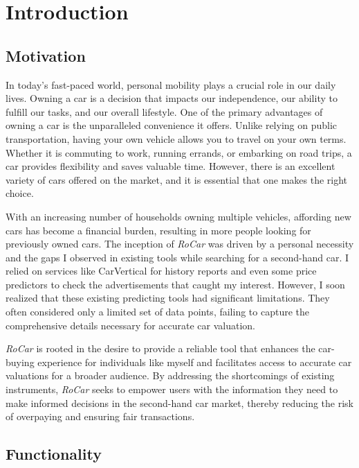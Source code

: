 \chapter{Introduction}

\section{Motivation}

In today's fast-paced world, personal mobility plays a crucial role in our daily lives. Owning a car is a decision that impacts our independence, our ability to fulfill our tasks, and our overall lifestyle. One of the primary advantages of owning a car is the unparalleled convenience it offers. Unlike relying on public transportation, having your own vehicle allows you to travel on your own terms. Whether it is commuting to work, running errands, or embarking on road trips, a car provides flexibility and saves valuable time. However, there is an excellent variety of cars offered on the market, and it is essential that one makes the right choice.

With an increasing number of households owning multiple vehicles, affording new cars has become a financial burden, resulting in more people looking for previously owned cars. The inception of \textit{RoCar} was driven by a personal necessity and the gaps I observed in existing tools while searching for a second-hand car. I relied on services like CarVertical \cite{carVertical} for history reports and even some price predictors to check the advertisements that caught my interest. However, I soon realized that these existing predicting tools had significant limitations. They often considered only a limited set of data points, failing to capture the comprehensive details necessary for accurate car valuation.

\textit{RoCar} is rooted in the desire to provide a reliable tool that enhances the car-buying experience for individuals like myself and facilitates access to accurate car valuations for a broader audience. By addressing the shortcomings of existing instruments, \textit{RoCar} seeks to empower users with the information they need to make informed decisions in the second-hand car market, thereby reducing the risk of overpaying and ensuring fair transactions.

\section{Functionality}

